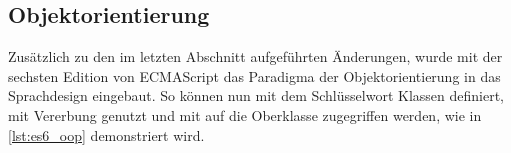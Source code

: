 \subsection{Objektorientierung}
\label{ssec:ge_objektorientierung}

Zusätzlich zu den im letzten Abschnitt aufgeführten Änderungen, wurde mit der
sechsten Edition von ECMAScript das Paradigma der Objektorientierung in das
Sprachdesign eingebaut.  So können nun mit dem Schlüsselwort 
Klassen definiert, mit  Vererbung genutzt und mit  auf
die Oberklasse zugegriffen werden, wie in \cref{lst:es6_oop} demonstriert wird.


